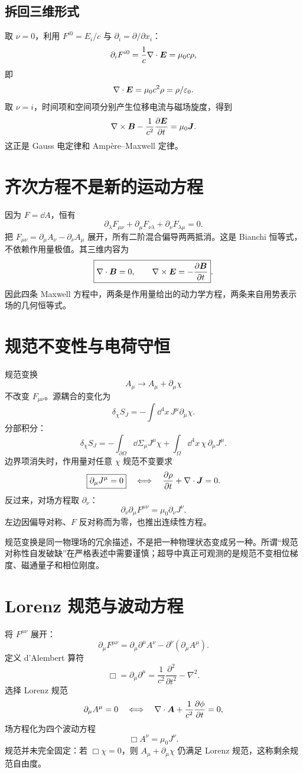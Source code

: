 \subsection{拆回三维形式}
取 $\nu=0$，利用
$F^{i0}=E_i/c$ 与 $\partial_i=\partial/\partial x_i$：
\[
\partial_iF^{i0}=\frac1c\nabla\cdot\bm{E}
=\mu_0c\rho,
\]
即
\[
\nabla\cdot\bm{E}=\mu_0c^2\rho=\rho/\varepsilon_0.
\]
取 $\nu=i$，时间项和空间项分别产生位移电流与磁场旋度，得到
\[
\nabla\times\bm{B}-\frac1{c^2}\frac{\partial \bm{E}}{\partial t}
=\mu_0\bm{J}.
\]
这正是 Gauss 电定律和 Ampère--Maxwell 定律。

\section{齐次方程不是新的运动方程}
因为 $F=\dd A$，恒有
\[
\partial_\lambda F_{\mu\nu}
+\partial_\mu F_{\nu\lambda}
+\partial_\nu F_{\lambda\mu}=0.
\]
把 $F_{\mu\nu}=\partial_\mu A_\nu-\partial_\nu A_\mu$ 展开，所有二阶混合偏导两两抵消。这是 Bianchi 恒等式，不依赖作用量极值。其三维内容为
\[
\boxed{\nabla\cdot\bm{B}=0,\qquad
\nabla\times\bm{E}=-\frac{\partial \bm{B}}{\partial t}}.
\]
因此四条 Maxwell 方程中，两条是作用量给出的动力学方程，两条来自用势表示场的几何恒等式。

\section{规范不变性与电荷守恒}
规范变换
\[
A_\mu\to A_\mu+\partial_\mu\chi
\]
不改变 $F_{\mu\nu}$。源耦合的变化为
\[
\delta_\chi S_J=-\int\dd^4x\,J^\mu\partial_\mu\chi.
\]
分部积分：
\[
\delta_\chi S_J
=-\int_{\partial\Omega}\dd\Sigma_\mu J^\mu\chi
+\int_\Omega\dd^4x\,\chi\,\partial_\mu J^\mu.
\]
边界项消失时，作用量对任意 $\chi$ 规范不变要求
\[
\boxed{\partial_\mu J^\mu=0}
\quad\Longleftrightarrow\quad
\frac{\partial \rho}{\partial t}+\nabla\cdot\bm{J}=0.
\]
反过来，对场方程取 $\partial_\nu$：
\[
\partial_\nu\partial_\mu F^{\mu\nu}
=\mu_0\partial_\nu J^\nu.
\]
左边因偏导对称、$F$ 反对称而为零，也推出连续性方程。

\begin{pitfallbox}
规范变换是同一物理场的冗余描述，不是把一种物理状态变成另一种。所谓“规范对称性自发破缺”在严格表述中需要谨慎；超导中真正可观测的是规范不变相位梯度、磁通量子和相位刚度。
\end{pitfallbox}

\section{Lorenz 规范与波动方程}
将 $F^{\mu\nu}$ 展开：
\[
\partial_\mu F^{\mu\nu}
=\partial_\mu\partial^\mu A^\nu
-\partial^\nu(\partial_\mu A^\mu).
\]
定义 d'Alembert 算符
\[
\Box=\partial_\mu\partial^\mu
=\frac1{c^2}\frac{\partial^2}{\partial t^2}-\nabla^2.
\]
选择 Lorenz 规范
\[
\partial_\mu A^\mu=0
\quad\Longleftrightarrow\quad
\nabla\cdot\bm{A}+\frac1{c^2}\frac{\partial \phi}{\partial t}=0,
\]
场方程化为四个波动方程
\[
\boxed{\Box A^\nu=\mu_0J^\nu}.
\]
规范并未完全固定：若 $\Box\chi=0$，则
$A_\mu+\partial_\mu\chi$ 仍满足 Lorenz 规范，这称剩余规范自由度。

